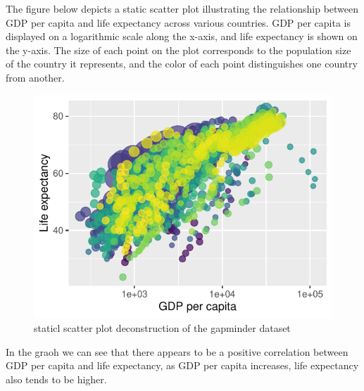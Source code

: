 \documentclass{article}\usepackage[]{graphicx}\usepackage[]{xcolor}
\makeatletter
\def\maxwidth{ %
  \ifdim\Gin@nat@width>\linewidth
    \linewidth
  \else
    \Gin@nat@width
  \fi
}
\newenvironment{knitrout}{}{} %
\numberwithin{equation}{section}
\makeatother
\begin{document}
\noindent
The figure below depicts a static scatter plot illustrating the relationship between GDP per capita and life expectancy across various countries. GDP per capita is displayed on a logarithmic scale along the x-axis, and life expectancy is shown on the y-axis. The size of each point on the plot corresponds to the population size of the country it represents, and the color of each point distinguishes one country from another.\\

\begin{knitrout}\scriptsize
{}\color{fgcolor}\begin{figure}[H]

{\centering \includegraphics[width=\maxwidth]{figure/beamer-gapminder_static-1} 

}

\caption[staticl scatter plot deconstruction of the gapminder dataset]{staticl scatter plot deconstruction of the gapminder dataset}\label{fig:gapminder_static}
\end{figure}

\end{knitrout}
\noindent
In the graoh we can see that there appears to be a positive correlation between GDP per capita and life expectancy, as GDP per capita increases, life expectancy also tends to be higher. \\
\end{document}
